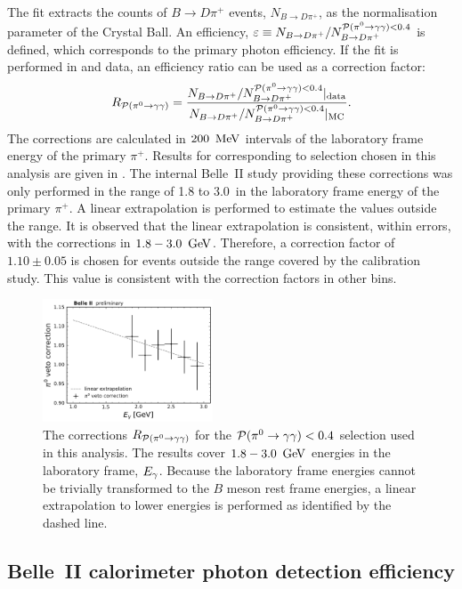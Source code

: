 The fit extracts the counts of $B\to D\pi^+$ events, $N_{B\to D\pi^+}$, as the normalisation parameter of the Crystal Ball.
An efficiency, $\varepsilon\equiv N_{B\rightarrow D\pi^+}/N^{{\mathcal{P}(\pi^0\rightarrow\gamma\gamma)}<0.4}_{B\rightarrow D\pi^+}$ is defined, which corresponds to the primary photon efficiency.
If the fit is performed in \MC and data, an efficiency ratio can be used as a correction factor:
\begin{equation}\label{eq:piveto_correction}
    R_{{\mathcal{P}(\pi^0\rightarrow\gamma\gamma)}} = \frac{N_{B\rightarrow D\pi^+}/N^{{\mathcal{P}(\pi^0\rightarrow\gamma\gamma)}<0.4}_{B\rightarrow D\pi^+}|_{\mathrm{data}}}{N_{B\rightarrow D\pi^+}/N^{{\mathcal{P}(\pi^0\rightarrow\gamma\gamma)}<0.4}_{B\rightarrow D\pi^+}|_{\mathrm{MC}}}.
\end{equation}
The corrections are calculated in $200~\mathrm{\,Me\kern -0.1em V}$ intervals of the laboratory frame energy of the primary $\pi^+$.
Results for corresponding to selection chosen in this analysis are given in .
The internal Belle~II study providing these corrections was only performed in the range of 1.8 to 3.0~\gev in the laboratory frame energy of the primary $\pi^+$.
A linear extrapolation is performed to estimate the values outside the range.
It is observed that the linear extrapolation is consistent, within errors, with the corrections in $1.8-3.0~\mathrm{\,Ge\kern -0.1em V}$.
Therefore, a correction factor of $1.10\pm0.05$ is chosen for events outside the range covered by the calibration study.
This value is consistent with the correction factors in other \Egamma bins.
\begin{figure}[htbp!]
    \centering
    \includegraphics[width=0.45\textwidth]{figures/data_sim_corrections/pi0veto_corrections.pdf}
    \caption{\label{fig:piveto_corrections} The corrections $R_{{\mathcal{P}(\pi^0\rightarrow\gamma\gamma)}}$ for the ${\mathcal{P}(\pi^0\rightarrow\gamma\gamma)}<0.4$ selection used in this analysis.
    The results cover $1.8-3.0~\mathrm{\,Ge\kern -0.1em V}$ energies in the laboratory frame, ${E_{\gamma}}$.
    Because the laboratory frame energies cannot be trivially transformed to the $B$ meson rest frame energies, a linear extrapolation to lower energies is performed as identified by the dashed line.
    }
\end{figure}

\subsection{Belle~II calorimeter photon detection efficiency}\label{sec:photon_efficiency}

